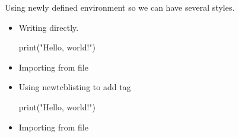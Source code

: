 \documentclass[a4paper]{article}
\begin{document}
\noindent Using newly defined environment so we can have several styles.
\begin{itemize}
\item Writing directly.
\begin{pythoncode}
print("Hello, world!")
\end{pythoncode}

\item Importing from file


\item Using newtcblisting to add tag
\begin{pythoncodetag}
print("Hello, world!")
\end{pythoncodetag}

\item Importing from file
\end{itemize}
\end{document}
